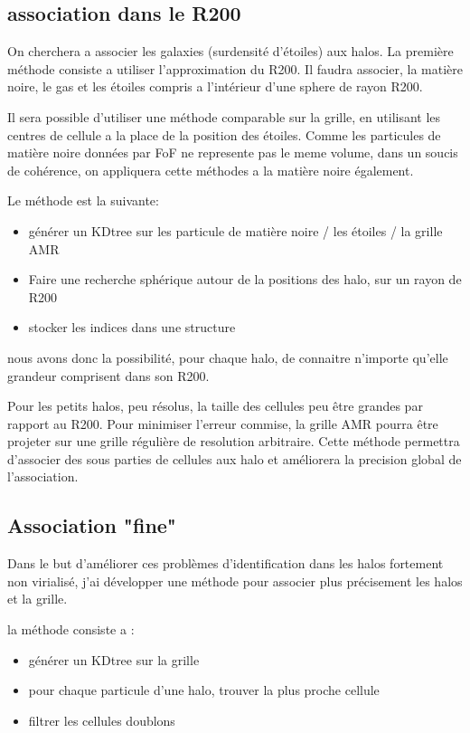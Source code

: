 \subsection{association dans le R200}

On cherchera a associer les galaxies  (surdensité d'étoiles) aux halos.
La première méthode consiste a utiliser l'approximation du R200.
Il faudra associer, la matière noire, le gas et les étoiles compris a l'intérieur d'une sphere de rayon R200.

Il sera possible d'utiliser une méthode comparable sur la grille, en utilisant les centres de cellule a la place de la position des étoiles.
Comme les particules de matière noire  données par FoF ne represente pas le meme volume, dans un soucis de cohérence, on appliquera cette méthodes a la matière noire également.

Le méthode est la suivante:

\begin{itemize}
\item générer un KDtree sur les particule de matière noire / les étoiles / la grille AMR
\item Faire une recherche sphérique autour de la positions des halo, sur un rayon de R200
\item stocker les indices dans une structure
\end{itemize}

nous avons donc la possibilité, pour chaque halo, de connaitre n'importe qu'elle grandeur comprisent dans son R200.


Pour les petits halos, peu résolus, la taille des cellules peu être grandes par rapport au R200.
Pour minimiser l'erreur commise, la grille AMR pourra être projeter sur une grille régulière de resolution arbitraire.
Cette méthode permettra d'associer des sous parties de cellules aux halo et améliorera la precision global de l'association.

\subsection{Association "fine"}
Dans le but d'améliorer ces problèmes d'identification dans les halos fortement non virialisé, j'ai développer une méthode pour associer plus précisement les halos et la grille.


la méthode consiste a :
\begin{itemize}
\item générer un KDtree sur la grille
\item pour chaque particule d'une halo, trouver la plus proche cellule
\item filtrer les cellules doublons
\end{itemize}


